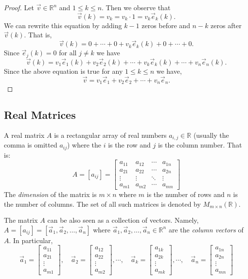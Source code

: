 \begin{proof}
Let $\vec{v} \in \mathbb{R}^n$ and $1\leq k\leq n$. Then we observe that  
\[\vec{v}(k)=v_k=v_k\cdot 1=v_k \vec{e}_k(k).\]
We can rewrite this equation by adding $k-1$ zeros before and $n-k$ zeros 
after $\vec{v}(k)$. That is,  
\[\vec{v}(k)=0+ \cdots + 0+v_k\vec{e}_k(k)+0+\cdots+0.\] 
Since $\vec{e}_j(k)=0$ for all $j\neq k$ we have 
\[\vec{v}(k)=v_1\vec{e}_1(k)+v_2\vec{e}_2(k)+\cdots+ v_k\vec{e}_k(k)+ \cdots + 
v_n\vec{e}_n(k).\]
Since the above equation is true for any $1\leq k\leq n$ we have,  
\[\vec{v}=v_1\vec{e}_1+v_2\vec{e}_2+\cdots+ v_n\vec{e}_n.\]
\end{proof}


\subsection{Real Matrices}

\begin{definition}[Matrix]
A real matrix $A$ is a rectangular array of real numbers $a_{i,j} \in 
\mathbb{R}$ (usually the comma is omitted $a_{ij}$)  where the $i$ is the row 
and $j$ is the column number. That is:
\[
A=[a_{ij}]=\begin{bmatrix}
a_{11} & a_{12} & \cdots & a_{1n} \\
a_{21} & a_{22} & \cdots & a_{2n} \\
\vdots & \vdots & \ddots & \vdots \\
a_{m1} & a_{m2} & \cdots & a_{mn} 
\end{bmatrix}
\]
The \emph{dimension} of the matrix is $m\times n$ where $m$ is the number of 
rows and $n$ is the number of columns. The set of all such matrices is denoted 
by $M_{m\times n}(\mathbb{R})$. 
\end{definition}
The matrix $A$ can be also seen as a collection of vectors. Namely, 
$A=[a_{ij}]=[\vec{a}_1, \vec{a}_2, \ldots, \vec{a}_n]$ where 
 $\vec{a}_1, \vec{a}_2,\ldots, \vec{a}_n \in \mathbb{R}^n$ are the \emph{column 
vectors} of $A$. In particular, 
\[
\vec{a}_1=\begin{bmatrix}a_{11}\\a_{21}\\ \vdots \\ a_{m1}\end{bmatrix}, \quad 
\vec{a}_2=\begin{bmatrix}a_{12}\\a_{22}\\ \vdots \\ a_{m2}\end{bmatrix}, 
\cdots, \quad 
\vec{a}_k=\begin{bmatrix}a_{1k}\\a_{2k}\\ \vdots \\ a_{mk}\end{bmatrix}, 
\cdots, \quad 
\vec{a}_n=\begin{bmatrix}a_{1n}\\a_{2n}\\ \vdots \\ a_{mn}\end{bmatrix}
\]

